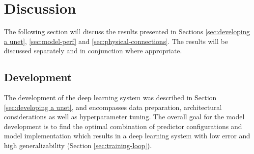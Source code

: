 \documentclass[../main/thesis]{subfiles}
\begin{document}
\section{Discussion}
\label{sec:discussion}
The following section will discuss the results presented in Sections \ref{sec:developing a unet}, \ref{sec:model-perf} and \ref{sec:physical-connections}. The results will be discussed separately and in conjunction where appropriate.

\subsection{Development}
The development of the deep learning system was described in Section \ref{sec:developing a unet}, and encompasses data preparation, architectural considerations as well as hyperparameter tuning. The overall goal for the model development is to find the optimal combination of predictor configurations and model implementation which results in a deep learning system with low error and high generalizability (Section \ref{sec:training-loop}).
\end{document}
